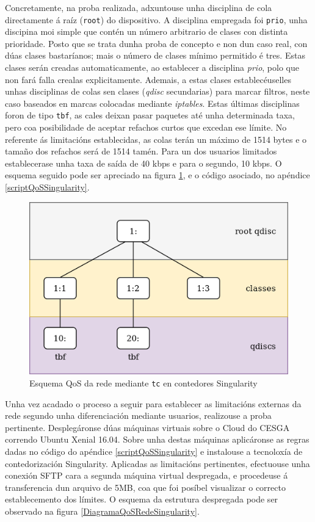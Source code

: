 Concretamente, na proba realizada, adxuntouse unha disciplina de cola directamente á raíz ({\tt root}) do dispositivo. A disciplina empregada foi {\tt prio}, unha discipina moi simple que contén un número arbitrario de clases con distinta prioridade. Posto que se trata dunha proba de concepto e non dun caso real, con dúas clases bastaríanos; mais o número de clases mínimo permitido é tres. Estas clases serán creadas automaticamente, ao establecer a disciplina {\it prio}, polo que non fará falla crealas explicitamente. Ademais, a estas clases establecéuselles unhas disciplinas de colas sen clases (\textit{qdisc} secundarias) para marcar filtros, neste caso baseados en marcas colocadas mediante \textit{iptables}. Estas últimas disciplinas foron de tipo {\tt tbf}, as cales deixan pasar paquetes até unha determinada taxa, pero coa posibilidade de aceptar refachos curtos que excedan ese límite. No referente ás limitacións establecidas, as colas terán un máximo de 1514 bytes e o tamaño dos refachos será de 1514 tamén. Para un dos usuarios limitados establecerase  unha taxa de saída de 40 kbps e para o segundo, 10 kbps. O esquema seguido pode ser apreciado na figura \ref{qdiscSingularity}, e o código asociado, no apéndice \ref{scriptQoSSingularity}. \\

\begin{figure}
\centerline{\includegraphics[width=15cm]{figuras/qdiscSingularity.png}}
\caption{Esquema QoS da rede mediante {\tt tc} en contedores Singularity}
\label{qdiscSingularity}
\end{figure}

Unha vez acadado o proceso a seguir para establecer as limitacións externas da rede segundo unha diferenciación mediante usuarios, realizouse a proba pertinente. Desplegáronse dúas máquinas virtuais sobre o Cloud do CESGA correndo Ubuntu Xenial 16.04. Sobre unha destas máquinas aplicáronse as regras dadas no código do apéndice \ref{scriptQoSSingularity} e instalouse a tecnoloxía de contedorización Singularity. Aplicadas as limitacións pertinentes, efectuouse unha conexión SFTP cara a segunda máquina virtual despregada, e procedeuse á transferencia dun arquivo de 5MB, coa que foi posíbel visualizar o correcto establecemento dos límites. O esquema da estrutura despregada pode ser observado na figura \ref{DiagramaQoSRedeSingularity}.\\

